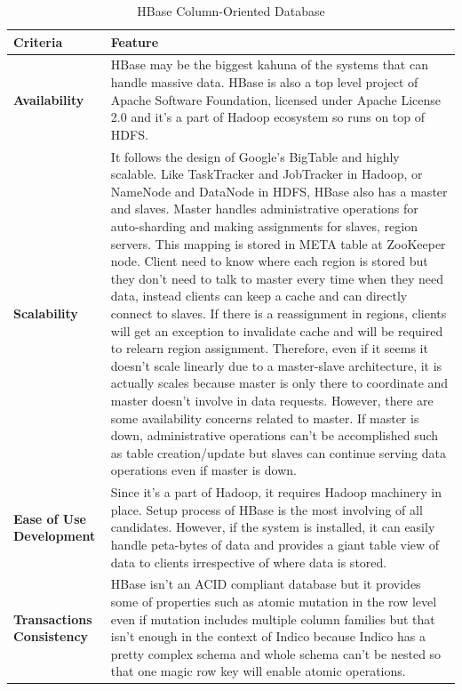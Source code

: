 \begin{table}[!ht]
  \centering
  \caption{HBase Column-Oriented Database}
  \renewcommand{\arraystretch}{1.5}
  \begin{tabular}{| >{\centering\bfseries}m{1in} | >{\centering\arraybackslash}m{4.5in} |}
	\hline
    \textbf{Criteria} & \textbf{Feature} \\
	\hline
    Availability &
    HBase may be the biggest kahuna of the systems that can handle massive data.
    HBase is also a top level project of Apache Software Foundation, licensed under Apache License 2.0 and it's a part of Hadoop ecosystem so runs on top of HDFS.
    \\ \hline
    Scalability &
    It follows the design of Google's BigTable and highly scalable.
    Like TaskTracker and JobTracker in Hadoop, or NameNode and DataNode in HDFS, HBase also has a master and slaves.
    Master handles administrative operations for auto-sharding and making assignments for slaves, region servers.
    This mapping is stored in META table at ZooKeeper node.
    Client need to know where each region is stored but they don't need to talk to master every time when they need data, instead clients can keep a cache and can directly connect to slaves.
    If there is a reassignment in regions, clients will get an exception to invalidate cache and will be required to relearn region assignment.
    Therefore, even if it seems it doesn't scale linearly due to a master-slave architecture, it is actually scales because master is only there to coordinate and master doesn't involve in data requests.
    However, there are some availability concerns related to master.
    If master is down, administrative operations can't be accomplished such as table creation/update but slaves can continue serving data operations even if master is down.
    \\ \hline
    Ease of Use Development &
    Since it's a part of Hadoop, it requires Hadoop machinery in place.
    Setup process of HBase is the most involving of all candidates.
    However, if the system is installed, it can easily handle peta-bytes of data and provides a giant table view of data to clients irrespective of where data is stored.
    \\ \hline
    Transactions Consistency &
    HBase isn't an ACID compliant database but it provides some of properties such as atomic mutation in the row level even if mutation includes multiple column families but that isn't enough in the context of Indico because Indico has a pretty complex schema and whole schema can't be nested so that one magic row key will enable atomic operations.

\end{tabular}
\end{table}
